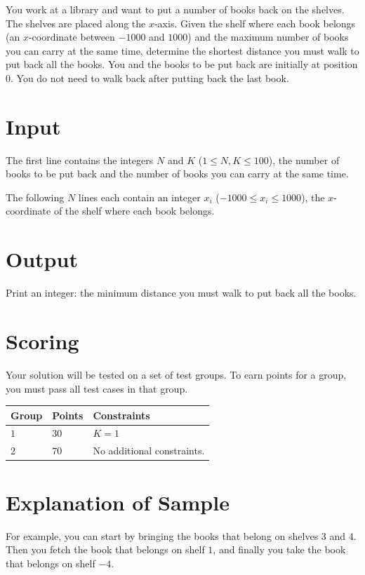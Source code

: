 You work at a library and want to put a number of books back on the shelves.
The shelves are placed along the $x$-axis.
Given the shelf where each book belongs (an $x$-coordinate between $-1000$ and $1000$) and the maximum number of books you can carry at the same time, determine the shortest distance you must walk to put back all the books.
You and the books to be put back are initially at position $0$.
You do not need to walk back after putting back the last book.

\section*{Input}
The first line contains the integers $N$ and $K$ ($1 \leq N, K \leq 100$),
the number of books to be put back and the number of books you can carry at the same time.

The following $N$ lines each contain an integer $x_i$ ($-1000 \leq x_i \leq 1000$),
the $x$-coordinate of the shelf where each book belongs.

\section*{Output}
Print an integer: the minimum distance you must walk to put back all the books.

\section*{Scoring}
Your solution will be tested on a set of test groups.
To earn points for a group, you must pass all test cases in that group.

\noindent
\begin{tabular}{| l | l | p{12cm} |}
  \hline
  \textbf{Group} & \textbf{Points} & \textbf{Constraints} \\ \hline
  $1$    & $30$        & $K = 1$ \\ \hline
  $2$    & $70$        & No additional constraints. \\ \hline
\end{tabular}

\section*{Explanation of Sample}
For example, you can start by bringing the books that belong on shelves $3$ and $4$.
Then you fetch the book that belongs on shelf $1$, and finally you take the book that belongs on shelf $-4$.
